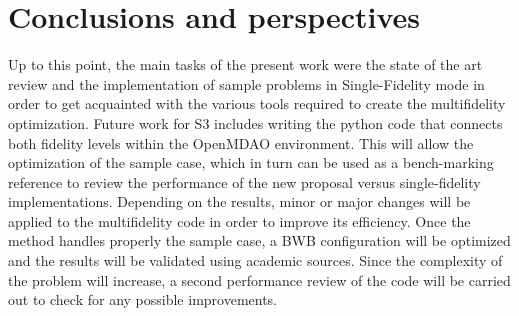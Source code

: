 \section{Conclusions and perspectives}
\label{sec:conclusions}
Up to this point, the main tasks of the present work were the state of the art review and the implementation of sample problems in Single-Fidelity mode in order to get acquainted with the various tools required to create the multifidelity optimization. 
Future work for S3 includes writing the python code that connects both fidelity levels within the OpenMDAO environment. This will allow the optimization of the sample case, which in turn can be used as a bench-marking reference to review the performance of the new proposal versus single-fidelity implementations. Depending on the results, minor or major changes will be applied to the multifidelity code in order to improve its efficiency. Once the method handles properly the sample case, a BWB configuration will be optimized and the results will be validated using academic sources. Since the complexity of the problem will increase, a second performance review of the code will be carried out to check for any possible improvements.   
